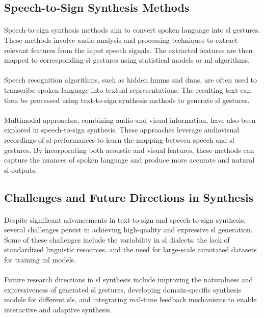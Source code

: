 \subsection{Speech-to-Sign Synthesis Methods}
\paragraph{}
Speech-to-sign synthesis methods aim to convert spoken language into \ac{sl} gestures. These methods involve audio analysis and processing techniques to extract relevant features from the input speech signals. The extracted features are then mapped to corresponding \ac{sl} gestures using statistical models or \ac{ml} algorithms.
\paragraph{}
Speech recognition algorithms, such as hidden \ac{hmm}s and \ac{dnn}s, are often used to transcribe spoken language into textual representations. The resulting text can then be processed using text-to-sign synthesis methods to generate \ac{sl} gestures.
\paragraph{}
Multimodal approaches, combining audio and visual information, have also been explored in speech-to-sign synthesis. These approaches leverage audiovisual recordings of \ac{sl} performances to learn the mapping between speech and \ac{sl} gestures. By incorporating both acoustic and visual features, these methods can capture the nuances of spoken language and produce more accurate and natural \ac{sl} outputs.
\subsection{Challenges and Future Directions in Synthesis}
\paragraph{}
Despite significant advancements in text-to-sign and speech-to-sign synthesis, several challenges persist in achieving high-quality and expressive \ac{sl} generation. Some of these challenges include the variability in \ac{sl} dialects, the lack of standardized linguistic resources, and the need for large-scale annotated datasets for training \ac{ml} models.
\paragraph{}
Future research directions in \ac{sl} synthesis include improving the naturalness and expressiveness of generated \ac{sl} gestures, developing domain-specific synthesis models for different \ac{sl}s, and integrating real-time feedback mechanisms to enable interactive and adaptive synthesis.
